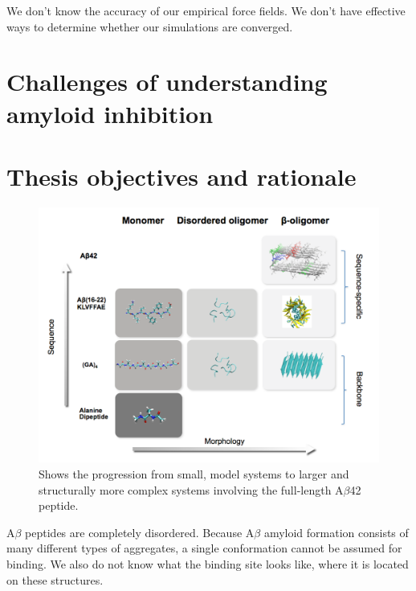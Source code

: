 \1 We don't know the accuracy of our empirical force fields. We don't have effective ways to determine whether our simulations are converged.

\section{Challenges of understanding amyloid inhibition}


\section{Thesis objectives and rationale}
\begin{figure}
  \centering
  \includegraphics[width=6in]{figures/introduction/matrix.pdf}
  \caption[Rationale]{Shows the progression from small, model systems to larger and structurally more complex systems involving the full-length A$\beta$42 peptide.}
  \label{fig:rationale}
\end{figure}

\1 A$\beta$ peptides are completely disordered.  Because A$\beta$ amyloid formation consists of many different types of aggregates, a single conformation cannot be assumed for binding.  We also do not know what the binding site looks like, where it is located on these structures.

